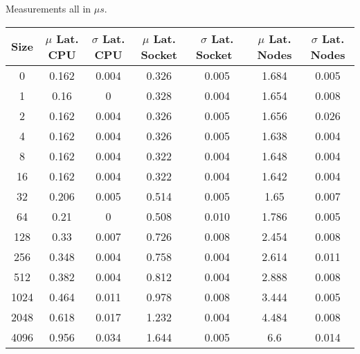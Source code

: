 \documentclass[UTF-8]{article}
\begin{document}
\begin{table}
	Measurements all in $\mu s$.
	\centering
	\begin{tabular}{|c|c|c|c|c|c|c|} 
		\hline
		Size    & $\mu$ Lat. CPU & $\sigma$ Lat. CPU & $\mu$ Lat. Socket & $\sigma$ Lat. Socket~ & $\mu$ Lat. Nodes & $\sigma$ Lat. Nodes  \\ 
		\hline
		0       & 0.162        & 0.004         & 0.326           & 0.005             & 1.684          & 0.005            \\ 
		\hline
		1       & 0.16         & 0             & 0.328           & 0.004             & 1.654          & 0.008            \\ 
		\hline
		2       & 0.162        & 0.004         & 0.326           & 0.005             & 1.656          & 0.026            \\ 
		\hline
		4       & 0.162        & 0.004         & 0.326           & 0.005             & 1.638          & 0.004            \\ 
		\hline
		8       & 0.162        & 0.004         & 0.322           & 0.004             & 1.648          & 0.004            \\ 
		\hline
		16      & 0.162        & 0.004         & 0.322           & 0.004             & 1.642          & 0.004            \\ 
		\hline
		32      & 0.206        & 0.005         & 0.514           & 0.005             & 1.65           & 0.007            \\ 
		\hline
		64      & 0.21         & 0             & 0.508           & 0.010             & 1.786          & 0.005            \\ 
		\hline
		128     & 0.33         & 0.007         & 0.726           & 0.008             & 2.454          & 0.008            \\ 
		\hline
		256     & 0.348        & 0.004         & 0.758           & 0.004             & 2.614          & 0.011            \\ 
		\hline
		512     & 0.382        & 0.004         & 0.812           & 0.004             & 2.888          & 0.008            \\ 
		\hline
		1024    & 0.464        & 0.011         & 0.978           & 0.008             & 3.444          & 0.005            \\ 
		\hline
		2048    & 0.618        & 0.017         & 1.232           & 0.004             & 4.484          & 0.008            \\ 
		\hline
		4096    & 0.956        & 0.034         & 1.644           & 0.005             & 6.6            & 0.014            \\ 

\end{tabular}
\end{table}
\end{document}

